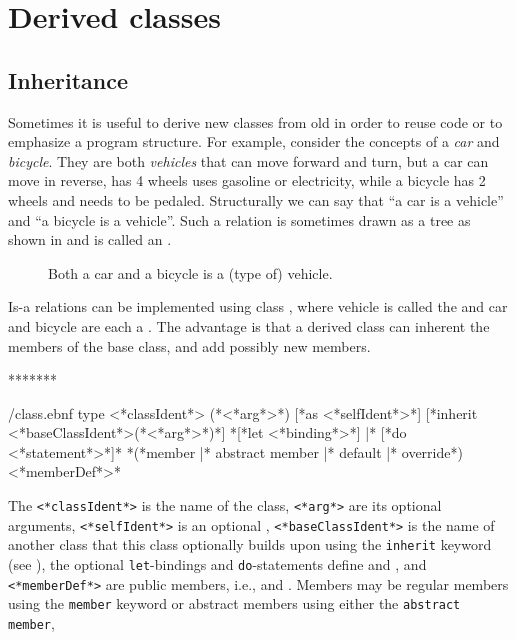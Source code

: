 \chapter{Derived classes}
\label{chap:derivedClasses}
\section{Inheritance}
\label{sec:inheritance}
Sometimes it is useful to derive new classes from old in order to reuse code or to emphasize a program structure. For example, consider the concepts of a \emph{car} and \emph{bicycle}. They are both \emph{vehicles} that can move forward and turn, but a car can move in reverse, has 4 wheels uses gasoline or electricity, while a bicycle has 2 wheels and needs to be pedaled. Structurally we can say that ``a car is a vehicle'' and ``a bicycle is a vehicle''. Such a relation is sometimes drawn as a tree as shown in  and is called an .
%
\begin{figure}
  \centering
  \caption{Both a car and a bicycle is a (type of) vehicle.}
  \label{fig:inheritanceVehicle}
\end{figure}
%
Is-a relations can be implemented using class , where vehicle is called the  and car and bicycle are each a . The advantage is that a derived class can inherent the members of the base class,  and add possibly new members.

*******
%
\begin{verbatimwrite}{\ebnf/class.ebnf}
type <*classIdent*> ({*<*arg*>*}) [*as <*selfIdent*>*] 
  [*inherit <*baseClassIdent*>({*<*arg*>*})*]
  {*[*let <*binding*>*] |* [*do <*statement*>*]*}
  {*(*member |* abstract member |* default |* override*) <*memberDef*>*}
\end{verbatimwrite}
%
The \lstinline[language=syntax]{<*classIdent*>} is the name of the class, \lstinline[language=syntax]{<*arg*>} are its optional arguments, \lstinline[language=syntax]{<*selfIdent*>} is an optional , \lstinline[language=syntax]{<*baseClassIdent*>} is the name of another class that this class optionally builds upon using the \lstinline{inherit} keyword (see ), the optional \lstinline{let}-bindings and \lstinline{do}-statements define  and , and \lstinline[language=syntax]{<*memberDef*>} are public members, i.e.,  and . Members may be regular members using the \lstinline{member} keyword or abstract members using either the \lstinline{abstract member}, 

